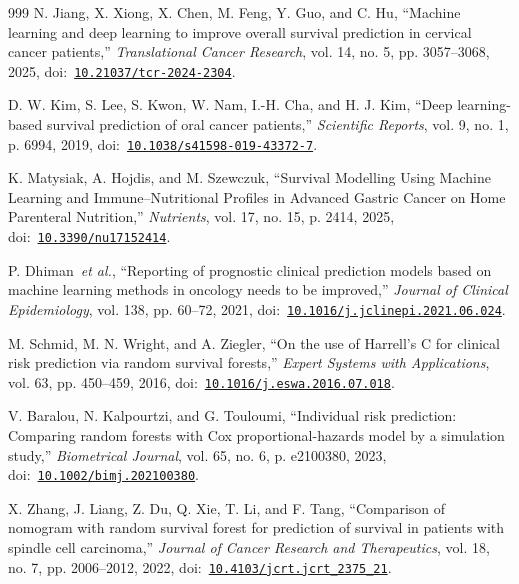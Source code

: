 \begin{thebibliography}{999}
\def\currentbiburl{https://doi.org/10.21037/tcr-2024-2304}
 N. Jiang, X. Xiong, X. Chen, M. Feng, Y. Guo, and C. Hu, ``Machine learning and deep learning to improve overall survival prediction in cervical cancer patients,'' \emph{Translational Cancer Research}, vol. 14, no. 5, pp. 3057--3068, 2025, doi:~\href{https://doi.org/10.21037/tcr-2024-2304}{\nolinkurl{10.21037/tcr-2024-2304}}.

\def\currentbiburl{https://doi.org/10.1038/s41598-019-43372-7}
 D. W. Kim, S. Lee, S. Kwon, W. Nam, I.-H. Cha, and H. J. Kim, ``Deep learning-based survival prediction of oral cancer patients,'' \emph{Scientific Reports}, vol. 9, no. 1, p. 6994, 2019, doi:~\href{https://doi.org/10.1038/s41598-019-43372-7}{\nolinkurl{10.1038/s41598-019-43372-7}}.

\def\currentbiburl{https://doi.org/10.3390/nu17152414}
 K. Matysiak, A. Hojdis, and M. Szewczuk, ``Survival Modelling Using Machine Learning and Immune–Nutritional Profiles in Advanced Gastric Cancer on Home Parenteral Nutrition,'' \emph{Nutrients}, vol. 17, no. 15, p. 2414, 2025, doi:~\href{https://doi.org/10.3390/nu17152414}{\nolinkurl{10.3390/nu17152414}}.

\def\currentbiburl{https://doi.org/10.1016/j.jclinepi.2021.06.024}
 P. Dhiman~\emph{et al.}, ``Reporting of prognostic clinical prediction models based on machine learning methods in oncology needs to be improved,'' \emph{Journal of Clinical Epidemiology}, vol. 138, pp. 60--72, 2021, doi:~\href{https://doi.org/10.1016/j.jclinepi.2021.06.024}{\nolinkurl{10.1016/j.jclinepi.2021.06.024}}.

\def\currentbiburl{https://doi.org/10.1016/j.eswa.2016.07.018}
 M. Schmid, M. N. Wright, and A. Ziegler, ``On the use of Harrell’s C for clinical risk prediction via random survival forests,'' \emph{Expert Systems with Applications}, vol. 63, pp. 450--459, 2016, doi:~\href{https://doi.org/10.1016/j.eswa.2016.07.018}{\nolinkurl{10.1016/j.eswa.2016.07.018}}.

\def\currentbiburl{https://doi.org/10.1002/bimj.202100380}
 V. Baralou, N. Kalpourtzi, and G. Touloumi, ``Individual risk prediction: Comparing random forests with Cox proportional-hazards model by a simulation study,'' \emph{Biometrical Journal}, vol. 65, no. 6, p. e2100380, 2023, doi:~\href{https://doi.org/10.1002/bimj.202100380}{\nolinkurl{10.1002/bimj.202100380}}.

\def\currentbiburl{https://doi.org/10.4103/jcrt.jcrt_2375_21}
 X. Zhang, J. Liang, Z. Du, Q. Xie, T. Li, and F. Tang, ``Comparison of nomogram with random survival forest for prediction of survival in patients with spindle cell carcinoma,'' \emph{Journal of Cancer Research and Therapeutics}, vol. 18, no. 7, pp. 2006--2012, 2022, doi:~\href{https://doi.org/10.4103/jcrt.jcrt_2375_21}{\nolinkurl{10.4103/jcrt.jcrt_2375_21}}.


\end{thebibliography}
